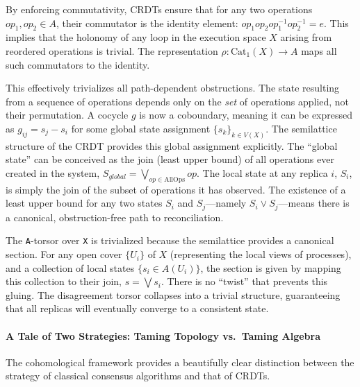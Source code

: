 \documentclass[
]{article}
\begin{document}
By enforcing commutativity, CRDTs ensure that for any two operations
\(op_1, op_2 \in A\), their commutator is the identity element:
\(op_1 op_2 op_1^{-1} op_2^{-1} = e\). This implies that the holonomy of
any loop in the execution space \(X\) arising from reordered operations
is trivial. The representation \(\rho: \text{Cat}_1(X) \to A\) maps all
such commutators to the identity.

This effectively trivializes all path-dependent obstructions. The state
resulting from a sequence of operations depends only on the \emph{set}
of operations applied, not their permutation. A cocycle \(g\) is now a
coboundary, meaning it can be expressed as \(g_{ij} = s_j - s_i\) for
some global state assignment \(\{s_k\}_{k \in V(X)}\). The semilattice
structure of the CRDT provides this global assignment explicitly. The
``global state'' can be conceived as the join (least upper bound) of all
operations ever created in the system,
\(S_{global} = \bigvee_{op \in \text{AllOps}} op\). The local state at
any replica \(i\), \(S_i\), is simply the join of the subset of
operations it has observed. The existence of a least upper bound for any
two states \(S_i\) and \(S_j\)---namely \(S_i \lor S_j\)---means there
is a canonical, obstruction-free path to reconciliation.

The \texttt{A}-torsor over \texttt{X} is trivialized because the
semilattice provides a canonical section. For any open cover \(\{U_i\}\)
of \(X\) (representing the local views of processes), and a collection
of local states \(\{s_i \in A(U_i)\}\), the section is given by mapping
this collection to their join, \(s = \bigvee s_i\). There is no
``twist'' that prevents this gluing. The disagreement torsor collapses
into a trivial structure, guaranteeing that all replicas will eventually
converge to a consistent state.

\paragraph{A Tale of Two Strategies: Taming Topology vs.~Taming
Algebra}\label{a-tale-of-two-strategies-taming-topology-vs.-taming-algebra}

The cohomological framework provides a beautifully clear distinction
between the strategy of classical consensus algorithms and that of
CRDTs.
\end{document}
